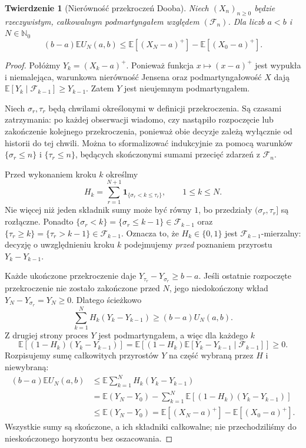 \documentclass[11pt,a4paper,oneside]{report}
\numberwithin{equation}{chapter}
\theoremstyle{plain}
\newtheorem{twierdzenie}{Twierdzenie}[chapter]
\theoremstyle{definition}
\theoremstyle{remark}
\newcommand{\N}{\mathbb{N}}
\newcommand{\E}{\mathbb{E}}
\newcommand{\ind}[1]{\mathbf{1}_{#1}}
\begin{document}
\begin{twierdzenie}[Nierówność przekroczeń Dooba]
Niech $(X_n)_{n\geq0}$ będzie rzeczywistym,
całkowalnym podmartyngałem względem
$(\mathcal F_n)$. Dla liczb $a<b$ i $N\in\N_0$
\[
(b-a)\E U_N(a,b)
\leq\E[(X_N-a)^+]-\E[(X_0-a)^+].
\]
\end{twierdzenie}
\begin{proof}
Połóżmy $Y_k=(X_k-a)^+$. Ponieważ funkcja
$x\mapsto(x-a)^+$ jest wypukła i niemalejąca,
warunkowa nierówność Jensena oraz podmartyngałowość
$X$ dają
$\E[Y_k\mid\mathcal F_{k-1}]\geq Y_{k-1}$.
Zatem $Y$ jest nieujemnym podmartyngałem.

Niech $\sigma_r,\tau_r$ będą chwilami określonymi
w definicji przekroczenia. Są czasami zatrzymania:
po każdej obserwacji wiadomo, czy nastąpiło
rozpoczęcie lub zakończenie kolejnego przekroczenia,
ponieważ obie decyzje zależą wyłącznie od historii
do tej chwili. Można to sformalizować indukcyjnie
za pomocą warunków $\{\sigma_r\leq n\}$ i
$\{\tau_r\leq n\}$, będących skończonymi sumami
przecięć zdarzeń z $\mathcal F_n$.

Przed wykonaniem kroku $k$ określmy
\[
H_k=\sum_{r=1}^{N+1}
 \ind{\{\sigma_r<k\leq\tau_r\}},
 \qquad 1\leq k\leq N.
\]
Nie więcej niż jeden składnik sumy może być równy
$1$, bo przedziały $(\sigma_r,\tau_r]$ są rozłączne.
Ponadto
$\{\sigma_r<k\}=\{\sigma_r\leq k-1\}\in\mathcal F_{k-1}$
oraz $\{\tau_r\geq k\}=\{\tau_r>k-1\}\in\mathcal F_{k-1}$.
Oznacza to, że $H_k\in\{0,1\}$ jest
$\mathcal F_{k-1}$-mierzalny: decyzję o
uwzględnieniu kroku $k$ podejmujemy \emph{przed}
poznaniem przyrostu $Y_k-Y_{k-1}$.

Każde ukończone przekroczenie daje
$Y_{\tau_r}-Y_{\sigma_r}\geq b-a$.
Jeśli ostatnie rozpoczęte przekroczenie nie
zostało zakończone przed $N$, jego niedokończony
wkład $Y_N-Y_{\sigma_r}=Y_N\geq0$.
Dlatego ścieżkowo
\[
\sum_{k=1}^N H_k(Y_k-Y_{k-1})
 \geq(b-a)U_N(a,b).
\]
Z drugiej strony proces $Y$ jest podmartyngałem,
a więc dla każdego $k$
\[
\E[(1-H_k)(Y_k-Y_{k-1})]
=\E[(1-H_k)\E[Y_k-Y_{k-1}\mid\mathcal F_{k-1}]]\geq0.
\]
Rozpisujemy sumę całkowitych przyrostów $Y$ na
część wybraną przez $H$ i niewybraną:
\begin{align*}
(b-a)\E U_N(a,b)
&\leq\E\sum_{k=1}^NH_k(Y_k-Y_{k-1})\\
&=\E(Y_N-Y_0)
 -\sum_{k=1}^N\E[(1-H_k)(Y_k-Y_{k-1})]\\
&\leq\E(Y_N-Y_0)
=\E[(X_N-a)^+]-\E[(X_0-a)^+].
\end{align*}
Wszystkie sumy są skończone, a ich składniki
całkowalne; nie przechodziliśmy do nieskończonego
horyzontu bez oszacowania.
\end{proof}
\end{document}
